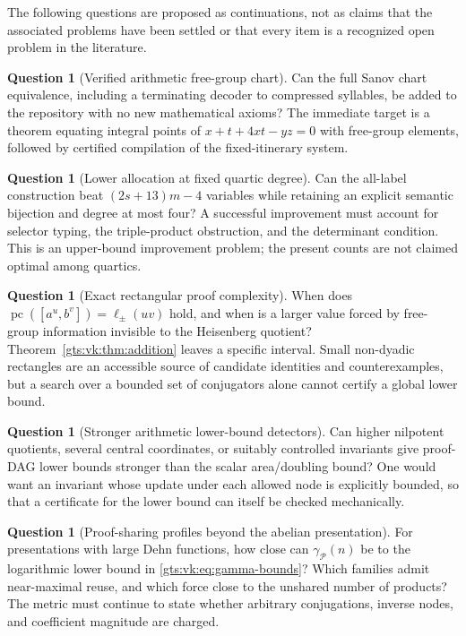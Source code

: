 \documentclass[11pt,letterpaper]{article}
\theoremstyle{definition}
\newtheorem{question}[theorem]{Question}
\theoremstyle{remark}
\newcommand{\Pp}{\mathcal P}
\newcommand{\pc}{\operatorname{pc}}
\begin{document}
The following questions are proposed as continuations, not as claims that the associated problems have been settled or that every item is a recognized open problem in the literature.

\begin{question}[Verified arithmetic free-group chart]\label{gts:vk:q:chart}
Can the full Sanov chart equivalence, including a terminating decoder to compressed syllables, be added to the repository with no new mathematical axioms? The immediate target is a theorem equating integral points of $x+t+4xt-yz=0$ with free-group elements, followed by certified compilation of the fixed-itinerary system.
\end{question}

\begin{question}[Lower allocation at fixed quartic degree]\label{gts:vk:q:allocation}
Can the all-label construction beat $(2s+13)m-4$ variables while retaining an explicit semantic bijection and degree at most four? A successful improvement must account for selector typing, the triple-product obstruction, and the determinant condition. This is an upper-bound improvement problem; the present counts are not claimed optimal among quartics.
\end{question}

\begin{question}[Exact rectangular proof complexity]\label{gts:vk:q:rectangular}
When does
$\pc([a^u,b^v])=\ell_{\pm}(uv)$ hold, and when is a larger value forced by free-group information invisible to the Heisenberg quotient? Theorem~\ref{gts:vk:thm:addition} leaves a specific interval. Small non-dyadic rectangles are an accessible source of candidate identities and counterexamples, but a search over a bounded set of conjugators alone cannot certify a global lower bound.
\end{question}

\begin{question}[Stronger arithmetic lower-bound detectors]\label{gts:vk:q:detectors}
Can higher nilpotent quotients, several central coordinates, or suitably controlled invariants give proof-DAG lower bounds stronger than the scalar area/doubling bound? One would want an invariant whose update under each allowed node is explicitly bounded, so that a certificate for the lower bound can itself be checked mechanically.
\end{question}

\begin{question}[Proof-sharing profiles beyond the abelian presentation]\label{gts:vk:q:sharing}
For presentations with large Dehn functions, how close can
$\gamma_{\Pp}(n)$ be to the logarithmic lower bound in
\eqref{gts:vk:eq:gamma-bounds}? Which families admit near-maximal reuse, and which force close to the unshared number of products? The metric must continue to state whether arbitrary conjugations, inverse nodes, and coefficient magnitude are charged.
\end{question}
\end{document}
